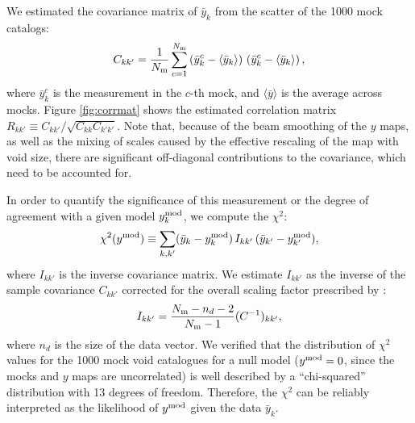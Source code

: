 \documentclass[twocolumn,amsfont,amssymb,amsmath, showpacs,balancelastpage, nofootinbib]{revtex4-1}
\begin{document}
      We estimated the covariance matrix of $\bar{y}_k$ from the scatter of the 1000 mock catalogs:
      \begin{equation}
        C_{kk'}=\frac{1}{N_{\rm m}}\sum_{c=1}^{N_{\rm m}}
        \left(\bar{y}^c_k-\langle\bar{y}_k\rangle\right)\,
        \left(\bar{y}^c_k-\langle\bar{y}_k\rangle\right),
      \end{equation}
      where $\bar{y}^c_k$ is the measurement in the $c$-th mock, and $\langle\bar{y}\rangle$ is
      the average across mocks. Figure \ref{fig:corrmat} shows the estimated correlation matrix
      $R_{kk'}\equiv C_{kk'}/\sqrt{C_{kk}C_{k'k'}}$. Note that, because of the beam smoothing
      of the $y$ maps, as well as the mixing of scales caused by the effective rescaling of
      the map with void size, there are significant off-diagonal contributions to the covariance,
      which need to be accounted for.

      In order to quantify the significance of this measurement or the degree of agreement with
      a given model $y^{\rm mod}_k$, we compute the $\chi^2$:
      \begin{equation}
        \chi^2(y^{\rm mod})\equiv\sum_{k,k'}(\bar{y}_k-y^{\rm mod}_k)\,I_{kk'}\,
        (\bar{y}_{k'}-y^{\rm mod}_{k'}),
      \end{equation}
      where $I_{kk'}$ is the inverse covariance matrix. We estimate $I_{kk'}$ as the inverse of
      the sample covariance $C_{kk'}$ corrected for the overall scaling factor prescribed by
      \cite{2007A&A...464..399H}:
      \begin{equation}
        I_{kk'}=\frac{N_{\rm m}-n_d-2}{N_{\rm m}-1}(C^{-1})_{kk'},
      \end{equation}
      where $n_d$ is the size of the data vector. We verified that the distribution of $\chi^2$
      values for the 1000 mock void catalogues for a null model ($y^{\rm mod}=0$, since the
      mocks and $y$ maps are uncorrelated) is well described by a ``chi-squared'' distribution
      with 13 degrees of freedom. Therefore, the $\chi^2$ can be reliably interpreted as the
      likelihood of $y^{\rm mod}$ given the data $\bar{y}_k$.
      
\end{document}
